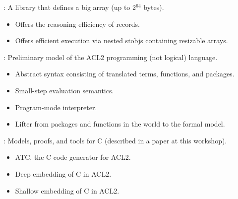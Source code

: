 

\begin{frame}[fragile]

\newlibtitle

:
A library that defines a big array (up to 2$^{64}$ bytes).
\begin{itemize}
\item Offers the reasoning efficiency of records.
\item Offers efficient execution via nested stobjs containing resizable arrays.
\end{itemize}

\end{frame}


\begin{frame}[fragile]

\newlibtitle

:
Preliminary model of the ACL2 programming (not logical) language.
\begin{itemize}
\item Abstract syntax consisting of translated terms, functions, and packages.
\item Small-step evaluation semantics.
\item Program-mode interpreter.
\item Lifter from packages and functions in the world to the formal model.
\end{itemize}

\end{frame}


\begin{frame}

\newlibtitle

:
Models, proofs, and tools for C (described in a paper at this workshop).
\begin{itemize}
\item ATC, the C code generator for ACL2.
\item Deep embedding of C in ACL2.
\item Shallow embedding of C in ACL2.
\end{itemize}

\end{frame}

